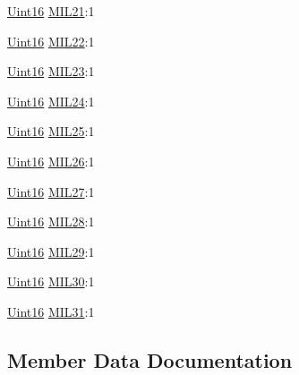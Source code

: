 \begin{DoxyCompactItemize}
\hyperlink{_d_s_p2833x___device_8h_a59a9f6be4562c327cbfb4f7e8e18f08b}{Uint16} \hyperlink{struct_c_a_n_m_i_l___b_i_t_s_a28f3b45fe820943a65d458111b639a56}{M\+I\+L21}\+:1
\item 
\hyperlink{_d_s_p2833x___device_8h_a59a9f6be4562c327cbfb4f7e8e18f08b}{Uint16} \hyperlink{struct_c_a_n_m_i_l___b_i_t_s_a5332b4987661704695b9c4dc9ebe812b}{M\+I\+L22}\+:1
\item 
\hyperlink{_d_s_p2833x___device_8h_a59a9f6be4562c327cbfb4f7e8e18f08b}{Uint16} \hyperlink{struct_c_a_n_m_i_l___b_i_t_s_a000a85d2a784208bbe6d2f87ae39c294}{M\+I\+L23}\+:1
\item 
\hyperlink{_d_s_p2833x___device_8h_a59a9f6be4562c327cbfb4f7e8e18f08b}{Uint16} \hyperlink{struct_c_a_n_m_i_l___b_i_t_s_af6114044731efee647e3f372b181a482}{M\+I\+L24}\+:1
\item 
\hyperlink{_d_s_p2833x___device_8h_a59a9f6be4562c327cbfb4f7e8e18f08b}{Uint16} \hyperlink{struct_c_a_n_m_i_l___b_i_t_s_a5508210c4132d14f8156e197994f6fc6}{M\+I\+L25}\+:1
\item 
\hyperlink{_d_s_p2833x___device_8h_a59a9f6be4562c327cbfb4f7e8e18f08b}{Uint16} \hyperlink{struct_c_a_n_m_i_l___b_i_t_s_a4b6388b92bebbf57e57f8e24e25e458d}{M\+I\+L26}\+:1
\item 
\hyperlink{_d_s_p2833x___device_8h_a59a9f6be4562c327cbfb4f7e8e18f08b}{Uint16} \hyperlink{struct_c_a_n_m_i_l___b_i_t_s_aba01fbcd49ad4ba608e4b18e0d8d8060}{M\+I\+L27}\+:1
\item 
\hyperlink{_d_s_p2833x___device_8h_a59a9f6be4562c327cbfb4f7e8e18f08b}{Uint16} \hyperlink{struct_c_a_n_m_i_l___b_i_t_s_af5b46a96240045213f109eecec993c8b}{M\+I\+L28}\+:1
\item 
\hyperlink{_d_s_p2833x___device_8h_a59a9f6be4562c327cbfb4f7e8e18f08b}{Uint16} \hyperlink{struct_c_a_n_m_i_l___b_i_t_s_a5d9eb711c1481d6a945d2471b753a2a0}{M\+I\+L29}\+:1
\item 
\hyperlink{_d_s_p2833x___device_8h_a59a9f6be4562c327cbfb4f7e8e18f08b}{Uint16} \hyperlink{struct_c_a_n_m_i_l___b_i_t_s_a2bdb3d0e392d22f20f6d1c2d544cb5a1}{M\+I\+L30}\+:1
\item 
\hyperlink{_d_s_p2833x___device_8h_a59a9f6be4562c327cbfb4f7e8e18f08b}{Uint16} \hyperlink{struct_c_a_n_m_i_l___b_i_t_s_ad3ad235b951ae4d3d31a6591c4fbc478}{M\+I\+L31}\+:1
\end{DoxyCompactItemize}


\subsection{Member Data Documentation}
\hypertarget{struct_c_a_n_m_i_l___b_i_t_s_aebfebd2f38aacec3d62586c9afdb5ff9}{}
